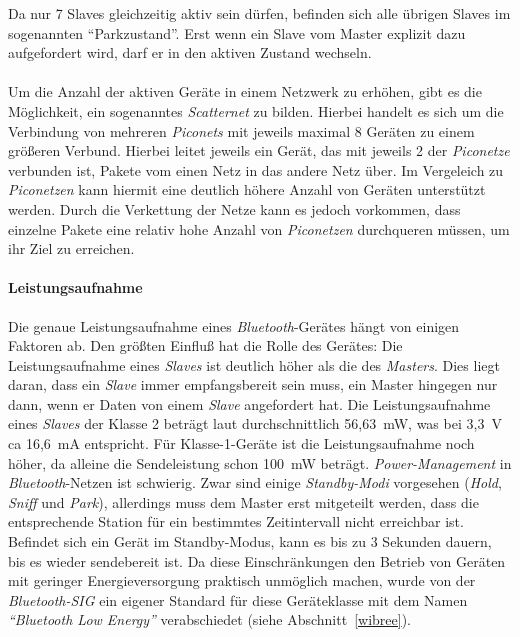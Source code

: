                 Da nur 7 Slaves gleichzeitig aktiv sein dürfen, befinden sich 
                alle übrigen Slaves im sogenannten "`Parkzustand"'. Erst wenn
                ein Slave vom Master explizit dazu aufgefordert wird, darf er in den
                aktiven Zustand wechseln. \\
                \\
                Um die Anzahl der aktiven Geräte in einem Netzwerk zu erhöhen,
                gibt es die Möglichkeit, ein sogenanntes \emph{Scatternet} zu bilden.
                Hierbei handelt es sich um die Verbindung von mehreren \emph{Piconets}
                mit jeweils maximal 8 Geräten zu einem größeren Verbund. Hierbei
                leitet jeweils ein Gerät, das mit jeweils 2 der \emph{Piconetze}
                verbunden ist, Pakete vom einen Netz in das andere Netz über.
                Im Vergeleich zu \emph{Piconetzen} kann hiermit eine deutlich höhere
                Anzahl von Geräten unterstützt werden. Durch die Verkettung 
                der Netze kann es jedoch vorkommen, dass einzelne Pakete
                eine relativ hohe Anzahl von \emph{Piconetzen} durchqueren müssen,
                um ihr Ziel zu erreichen.
            \paragraph{Leistungsaufnahme}
                Die genaue Leistungsaufnahme eines \emph{Bluetooth}-Gerätes hängt von 
                einigen Faktoren ab. Den größten Einfluß hat die Rolle des 
                Gerätes: Die Leistungsaufnahme eines \emph{Slaves} ist
                deutlich höher als die des \emph{Masters}. Dies liegt
                daran, dass ein \emph{Slave} immer empfangsbereit sein
                muss, ein Master hingegen nur dann, wenn er Daten von
                einem \emph{Slave} angefordert hat. Die Leistungsaufnahme
                eines \emph{Slaves} der Klasse 2 beträgt laut \cite{BluetoothPower}
                durchschnittlich 56,63~mW, was bei 3,3~V ca 16,6~mA entspricht.
                Für Klasse-1-Geräte ist die Leistungsaufnahme noch höher, 
                da alleine die Sendeleistung schon 100~mW beträgt.
                \emph{Power-Management} in \emph{Bluetooth}-Netzen ist schwierig. Zwar sind
                einige \emph{Standby-Modi} vorgesehen (\emph{Hold}, \emph{Sniff} und \emph{Park}), allerdings
                muss dem Master erst mitgeteilt werden, dass die entsprechende
                Station für ein bestimmtes Zeitintervall nicht erreichbar ist.
                Befindet sich ein Gerät im Standby-Modus, kann es bis zu 3 Sekunden
                dauern, bis es wieder sendebereit ist. Da diese Einschränkungen
                den Betrieb von Geräten mit geringer Energieversorgung
                praktisch unmöglich machen, wurde von der \emph{Bluetooth-SIG}
                ein eigener Standard für diese Geräteklasse mit dem Namen
                \emph{"`Bluetooth Low Energy"'} verabschiedet (siehe
                Abschnitt~\ref{wibree}).

